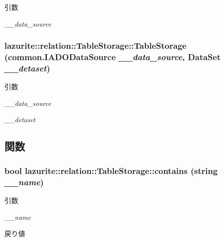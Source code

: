 \begin{DoxyParams}{引数}
\item[{\em \_\-\_\-data\_\-source}]\end{DoxyParams}
\hypertarget{classlazurite_1_1relation_1_1_table_storage_a8f92c96375b8b1077f283675cc698651}{
\subsubsection[{TableStorage}]{\setlength{\rightskip}{0pt plus 5cm}lazurite::relation::TableStorage::TableStorage ({\bf common.IADODataSource} {\em \_\-\_\-data\_\-source}, \/  DataSet {\em \_\-\_\-detaset})}}
\label{classlazurite_1_1relation_1_1_table_storage_a8f92c96375b8b1077f283675cc698651}

\begin{DoxyParams}{引数}
\item[{\em \_\-\_\-data\_\-source}]\item[{\em \_\-\_\-detaset}]\end{DoxyParams}


\subsection{関数}
\hypertarget{classlazurite_1_1relation_1_1_table_storage_a5b26c8b4b586befb3131fef66e57116a}{
\subsubsection[{contains}]{\setlength{\rightskip}{0pt plus 5cm}bool lazurite::relation::TableStorage::contains (string {\em \_\-\_\-name})}}
\label{classlazurite_1_1relation_1_1_table_storage_a5b26c8b4b586befb3131fef66e57116a}

\begin{DoxyParams}{引数}
\item[{\em \_\-\_\-name}]\end{DoxyParams}
\begin{DoxyReturn}{戻り値}

\end{DoxyReturn}


